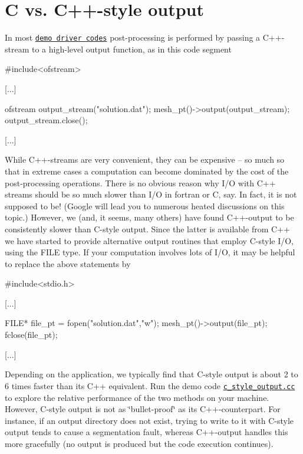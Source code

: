 \hypertarget{index_C_style_output}{}\section{C vs. C++-\/style output}\label{index_C_style_output}
In most \href{../../example_code_list/html/index.html}{\tt demo driver codes} post-\/processing is performed by passing a C++-\/stream to a high-\/level output function, as in this code segment 
\begin{DoxyCode}
\textcolor{preprocessor}{#include<ofstream>}

[...]

ofstream output\_stream(\textcolor{stringliteral}{"solution.dat"});
mesh\_pt()->output(output\_stream);
output\_stream.close();

[...]
\end{DoxyCode}


While C++-\/streams are very convenient, they can be expensive -- so much so that in extreme cases a computation can become dominated by the cost of the post-\/processing operations. There is no obvious reason why I/\-O with C++ streams should be so much slower than I/\-O in fortran or C, say. In fact, it is not supposed to be! (Google will lead you to numerous heated discussions on this topic.) However, we (and, it seems, many others) have found C++-\/output to be consistently slower than C-\/style output. Since the latter is available from C++ we have started to provide alternative output routines that employ C-\/style I/\-O, using the F\-I\-L\-E type. If your computation involves lots of I/\-O, it may be helpful to replace the above statements by


\begin{DoxyCode}
\textcolor{preprocessor}{#include<stdio.h>}

[...]

FILE* file\_pt = fopen(\textcolor{stringliteral}{"solution.dat"},\textcolor{stringliteral}{"w"});
mesh\_pt()->output(file\_pt);
fclose(file\_pt);

[...]
\end{DoxyCode}


Depending on the application, we typically find that C-\/style output is about 2 to 6 times faster than its C++ equivalent. Run the demo code \href{../../../demo_drivers/optimisation/C_style_output/c_style_output.cc}{\tt c\-\_\-style\-\_\-output.\-cc} to explore the relative performance of the two methods on your machine. However, C-\/style output is not as \char`\"{}bullet-\/proof\char`\"{} as its C++-\/counterpart. For instance, if an output directory does not exist, trying to write to it with C-\/style output tends to cause a segmentation fault, whereas C++-\/output handles this more gracefully (no output is produced but the code execution continues).



